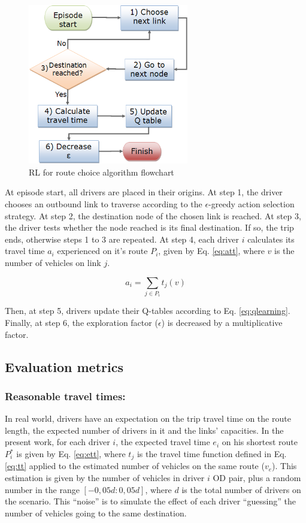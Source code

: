 \documentclass[12pt]{llncs}
\newcommand{\route}[1]{\ensuremath{P_#1}}	%
\newcommand{\optRoute}[1]{\ensuremath{P_#1^*}}	%
\newcommand{\travTime}{\ensuremath{t_j}} 	%
\newcommand{\veh}{\ensuremath{v}}		%
\newcommand{\ett}[1]{\ensuremath{e_#1}}		%
\newcommand{\expVeh}{\ensuremath{v_e}}		%
\newcommand{\att}[1]{\ensuremath{a_#1}}		%
\begin{document}
\begin{figure}[ht]
    \centerline{\includegraphics[width=7cm]{img/flowchart3.png}}
    \caption{RL for route choice algorithm flowchart}
    \label{fig:flowchart}
\end{figure}

At episode start, all drivers are placed in their origins. At step 1, the driver chooses an outbound link to traverse according to the $\epsilon$-greedy action selection strategy. At step 2, the destination node of the chosen link is reached. At step 3, the driver tests whether the node reached is its final destination. If so, the trip ends, otherwise steps 1 to 3 are repeated. At step 4, each driver $i$ calculates its travel time $\att{i}$ experienced on it's route $\route{i}$, given by Eq. \eqref{eq:att}, where $\veh$ is the number of vehicles on link $j$.

\begin{equation}
\label{eq:att}
\att{i} = \sum_{j \in \route{i}} \travTime(\veh)
\end{equation}

Then, at step 5, drivers update their Q-tables according to Eq. \eqref{eq:qlearning}. Finally, at step 6, the exploration factor ($\epsilon$) is decreased by a multiplicative factor.

\subsection{Evaluation metrics}

\subsubsection{Reasonable travel times:}
In real world, drivers have an expectation on the trip travel time on the route length, the expected number of drivers in it and the links' capacities. In the present work, for each driver $i$, the expected travel time $\ett{i}$ on his shortest route \optRoute{i} is given by Eq. \eqref{eq:ett}, where $\travTime$ is the travel time function defined in Eq. \eqref{eq:tt} applied to the estimated number of vehicles on the same route ($\expVeh$). This estimation is given by the number of vehicles in driver $i$ OD pair, plus a random number in the range $[-0,05d:0,05d]$, where $d$ is the total number of drivers on the scenario. This ``noise'' is to simulate the effect of each driver ``guessing'' the number of vehicles going to the same destination.
\end{document}

